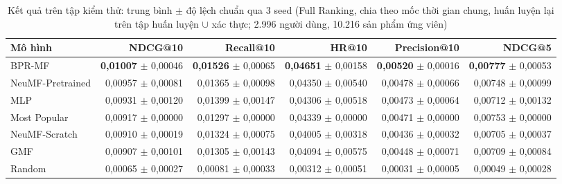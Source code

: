 \begin{table}[htbp]
    \centering\small
    \caption{Kết quả trên tập kiểm thử: trung bình $\pm$ độ lệch chuẩn qua 3 seed (Full Ranking, chia theo mốc thời gian chung, huấn luyện lại trên tập huấn luyện $\cup$ xác thực; 2.996 người dùng, 10.216 sản phẩm ứng viên)}
    \label{tab:final}
    \begin{adjustbox}{max width=\textwidth}
    \begin{tabular}{lrrrrr}
        \toprule
        Mô hình & NDCG@10 & Recall@10 & HR@10 & Precision@10 & NDCG@5 \\
        \midrule
        BPR-MF & \textbf{0{,}01007} $\pm$ 0{,}00046 & \textbf{0{,}01526} $\pm$ 0{,}00065 & \textbf{0{,}04651} $\pm$ 0{,}00158 & \textbf{0{,}00520} $\pm$ 0{,}00016 & \textbf{0{,}00777} $\pm$ 0{,}00053 \\
        NeuMF-Pretrained & 0{,}00957 $\pm$ 0{,}00081 & 0{,}01365 $\pm$ 0{,}00098 & 0{,}04350 $\pm$ 0{,}00540 & 0{,}00478 $\pm$ 0{,}00066 & 0{,}00748 $\pm$ 0{,}00099 \\
        MLP & 0{,}00931 $\pm$ 0{,}00120 & 0{,}01399 $\pm$ 0{,}00147 & 0{,}04306 $\pm$ 0{,}00518 & 0{,}00473 $\pm$ 0{,}00064 & 0{,}00712 $\pm$ 0{,}00132 \\
        Most Popular & 0{,}00917 $\pm$ 0{,}00000 & 0{,}01297 $\pm$ 0{,}00000 & 0{,}04339 $\pm$ 0{,}00000 & 0{,}00471 $\pm$ 0{,}00000 & 0{,}00753 $\pm$ 0{,}00000 \\
        NeuMF-Scratch & 0{,}00910 $\pm$ 0{,}00019 & 0{,}01324 $\pm$ 0{,}00075 & 0{,}04005 $\pm$ 0{,}00318 & 0{,}00436 $\pm$ 0{,}00032 & 0{,}00705 $\pm$ 0{,}00037 \\
        GMF & 0{,}00907 $\pm$ 0{,}00101 & 0{,}01305 $\pm$ 0{,}00143 & 0{,}04094 $\pm$ 0{,}00575 & 0{,}00448 $\pm$ 0{,}00071 & 0{,}00709 $\pm$ 0{,}00084 \\
        Random & 0{,}00065 $\pm$ 0{,}00027 & 0{,}00081 $\pm$ 0{,}00033 & 0{,}00312 $\pm$ 0{,}00051 & 0{,}00031 $\pm$ 0{,}00005 & 0{,}00049 $\pm$ 0{,}00028 \\
        \bottomrule
    \end{tabular}
    \end{adjustbox}
    \par{}
\end{table}
